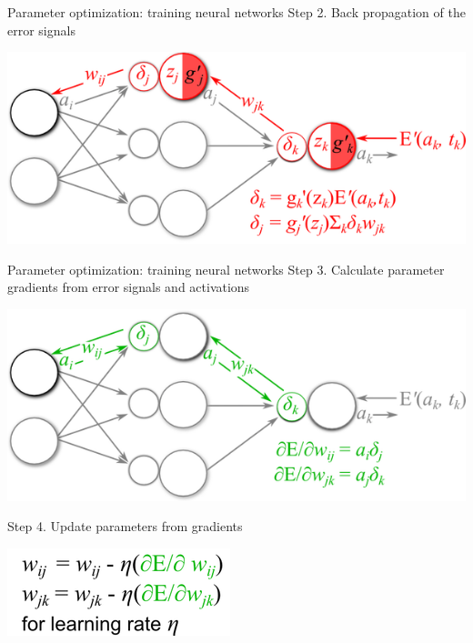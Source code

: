 \documentclass[xetex,compress]{beamer}
\begin{document}
\begin{frame}{Parameter optimization: training neural networks}
  Step 2. Back propagation of the error signals
  \begin{center}
    \includegraphics[width=1.00\textwidth]{./figures/backprop_2.png}
  \end{center}
\end{frame}

\begin{frame}{Parameter optimization: training neural networks}
  Step 3. Calculate parameter gradients from error signals and activations
  \begin{center}
    \includegraphics[width=1.00\textwidth]{./figures/backprop_3.png}
  \end{center}
  Step 4. Update parameters from gradients
  \begin{center}
    \includegraphics[scale=0.50]{./figures/backprop_4.png}
  \end{center}
\end{frame}
\end{document}
